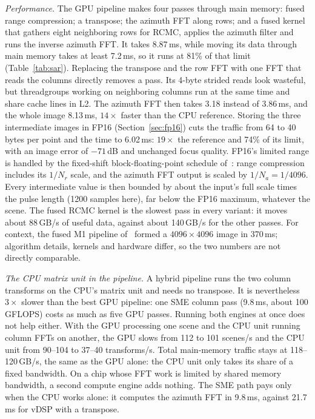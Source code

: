 \documentclass[conference]{IEEEtran}
\newcommand{\GF}{\,GFLOPS}
\begin{document}
\textit{Performance.} The GPU pipeline makes four passes through main memory: fused range compression;
a transpose; the azimuth FFT along rows; and a fused kernel that gathers eight neighboring rows for
RCMC, applies the azimuth filter and runs the inverse azimuth FFT. It takes 8.87\,ms, while moving its
data through main memory takes at least 7.2\,ms, so it runs at 81\% of that limit (Table~\ref{tab:sar}).
Replacing the transpose and the row FFT with one FFT that reads the columns directly removes a pass. Its
4-byte strided reads look wasteful, but threadgroups working on neighboring columns run at the same time
and share cache lines in L2. The azimuth FFT then takes 3.18 instead of 3.86\,ms, and the whole image
8.13\,ms, $14\times$ faster than the CPU reference. Storing the three intermediate images in FP16
(Section~\ref{sec:fp16}) cuts the traffic from 64 to 40 bytes per point and the time to 6.02\,ms:
$19\times$ the reference and 74\% of its limit, with an image error of $-71$\,dB and unchanged focus
quality. FP16's limited range is handled by the fixed-shift block-floating-point schedule
of~\cite{bergach2026fp16}: range compression includes its $1/N_r$ scale, and the azimuth FFT output is
scaled by $1/N_a=1/4096$. Every intermediate value is then bounded by about the input's full scale times
the pulse length (1200 samples here), far below the FP16 maximum, whatever the scene. The fused RCMC
kernel is the slowest pass in every variant: it moves about 88\,GB/s of useful data, against about
140\,GB/s for the other passes. For context, the fused M1 pipeline of~\cite{bergach2026sar} formed a
$4096\times4096$ image in 370\,ms; algorithm details, kernels and hardware differ, so the two numbers
are not directly comparable.

\textit{The CPU matrix unit in the pipeline.} A hybrid pipeline runs the two column transforms on the
CPU's matrix unit and needs no transpose. It is nevertheless $3\times$ slower than the best GPU
pipeline: one SME column pass (9.8\,ms, about 100\GF{}) costs as much as five GPU passes. Running both
engines at once does not help either. With the GPU processing one scene and the CPU unit running column
FFTs on another, the GPU slows from 112 to 101 scenes/s and the CPU unit from 90--104 to 37--40
transforms/s. Total main-memory traffic stays at 118--120\,GB/s, the same as the GPU alone: the CPU unit
only takes its share of a fixed bandwidth. On a chip whose FFT work is limited by shared memory
bandwidth, a second compute engine adds nothing. The SME path pays only when the CPU works alone: it
computes the azimuth FFT in 9.8\,ms, against 21.7\,ms for vDSP with a transpose.
\end{document}
